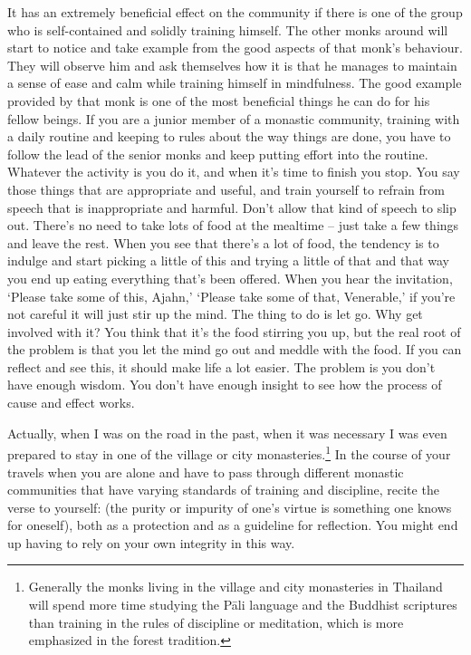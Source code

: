It has an extremely beneficial effect on the community if there is one of the group who is self-contained and solidly training himself. The other monks around will start to notice and take example from the good aspects of that monk's behaviour. They will observe him and ask themselves how it is that he manages to maintain a sense of ease and calm while training himself in mindfulness. The good example provided by that monk is one of the most beneficial things he can do for his fellow beings. If you are a junior member of a monastic community, training with a daily routine and keeping to rules about the way things are done, you have to follow the lead of the senior monks and keep putting effort into the routine. Whatever the activity is you do it, and when it's time to finish you stop. You say those things that are appropriate and useful, and train yourself to refrain from speech that is inappropriate and harmful. Don't allow that kind of speech to slip out. There's no need to take lots of food at the mealtime -- just take a few things and leave the rest. When you see that there's a lot of food, the tendency is to indulge and start picking a little of this and trying a little of that and that way you end up eating everything that's been offered. When you hear the invitation, `Please take some of this, Ajahn,' `Please take some of that, Venerable,' if you're not careful it will just stir up the mind. The thing to do is let go. Why get involved with it? You think that it's the food stirring you up, but the real root of the problem is that you let the mind go out and meddle with the food. If you can reflect and see this, it should make life a lot easier. The problem is you don't have enough wisdom. You don't have enough insight to see how the process of cause and effect works.

Actually, when I was on the road in the past, when it was necessary I was even prepared to stay in one of the village or city monasteries.\footnote{Generally the monks living in the village and city monasteries in Thailand will spend more time studying the P\=ali language and the Buddhist scriptures than training in the rules of discipline or meditation, which is more emphasized in the forest tradition.} In the course of your travels when you are alone and have to pass through different monastic communities that have varying standards of training and discipline, recite the verse to yourself:  (the purity or impurity of one's virtue is something one knows for oneself), both as a protection and as a guideline for reflection. You might end up having to rely on your own integrity in this way.

